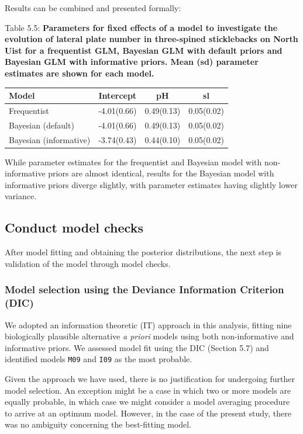 \documentclass[
]{book}
\begin{document}
Results can be combined and presented formally:

Table 5.5: \textbf{Parameters for fixed effects of a model to investigate the evolution of lateral plate number in three-spined sticklebacks on North Uist for a frequentist GLM, Bayesian GLM with default priors and Bayesian GLM with informative priors. Mean (sd) parameter estimates are shown for each model.}

\begin{longtable}[]{@{}lccc@{}}
\toprule
Model & Intercept & pH & sl \\
\midrule
\endhead
Frequentist & -4.01(0.66) & 0.49(0.13) & 0.05(0.02) \\
Bayesian (default) & -4.01(0.66) & 0.49(0.13) & 0.05(0.02) \\
Bayesian (informative) & -3.74(0.43) & 0.44(0.10) & 0.05(0.02) \\
\bottomrule
\end{longtable}

While parameter estimates for the frequentist and Bayesian model with non-informative priors are almost identical, results for the Bayesian model with informative priors diverge slightly, with parameter estimates having slightly lower variance.

\hypertarget{conduct-model-checks-1}{%
\subsection{Conduct model checks}\label{conduct-model-checks-1}}

After model fitting and obtaining the posterior distributions, the next step is validation of the model through model checks.

\hypertarget{pois-dic}{%
\subsubsection{Model selection using the Deviance Information Criterion (DIC)}\label{pois-dic}}

We adopted an information theoretic (IT) approach in this analysis, fitting nine biologically plausible alternative \emph{a priori} models using both non-informative and informative priors. We assessed model fit using the DIC (Section 5.7) and identified models \texttt{M09} and \texttt{I09} as the most probable.

Given the approach we have used, there is no justification for undergoing further model selection. An exception might be a case in which two or more models are equally probable, in which case we might consider a model averaging procedure to arrive at an optimum model. However, in the case of the present study, there was no ambiguity concerning the best-fitting model.
\end{document}
